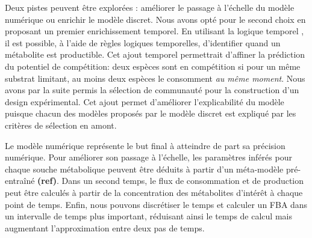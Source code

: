 \documentclass[../main.tex]{subfiles}
\begin{document}
Deux pistes peuvent être explorées : améliorer le passage à l'échelle du modèle numérique ou enrichir le modèle discret. Nous avons opté pour le second choix en proposant un premier enrichissement temporel. En utilisant la logique temporel \citep{Cabalar2019}, il est possible, à l'aide de règles logiques temporelles, d'identifier quand un métabolite est productible. Cet ajout temporel permettrait d'affiner la prédiction du potentiel de compétition: deux espèces sont en compétition si pour un même substrat limitant, au moins deux espèces le consomment \textsl{au même moment}. Nous avons par la suite permis la sélection de communauté pour la construction d'un design expérimental. Cet ajout permet d'améliorer l'explicabilité du modèle puisque chacun des modèles proposés par le modèle discret est expliqué par les critères de sélection en amont.

Le modèle numérique représente le but final à atteindre de part sa précision numérique. Pour améliorer son passage à l'échelle, les paramètres inférés pour chaque souche métabolique peuvent être déduits à partir d'un méta-modèle pré-entraîné \textbf{(ref)}. Dans un second temps, le flux de consommation et de production peut être calculés à partir de la concentration des métabolites d'intérêt à chaque point de temps. Enfin, nous pouvons discrétiser le temps et calculer un FBA dans un intervalle de temps plus important, réduisant ainsi le temps de calcul mais augmentant l'approximation entre deux pas de temps.




\end{document}
